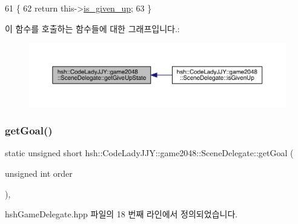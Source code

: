 \begin{DoxyCode}
61                                      \{
62                     \textcolor{keywordflow}{return} this->\hyperlink{classhsh_1_1_code_lady_j_j_y_1_1game2048_1_1_scene_delegate_a8ea6710e5c00d1af16c4566260c62501}{is\_given\_up};
63                 \}
\end{DoxyCode}
이 함수를 호출하는 함수들에 대한 그래프입니다.\+:
\nopagebreak
\begin{figure}[H]
\begin{center}
\leavevmode
\includegraphics[width=350pt]{d7/d4d/classhsh_1_1_code_lady_j_j_y_1_1game2048_1_1_scene_delegate_abe91b73b30ea51884c07d50f4a9664f3_icgraph}
\end{center}
\end{figure}
\mbox{\label{classhsh_1_1_code_lady_j_j_y_1_1game2048_1_1_scene_delegate_a4b1f64a13b6816a657bc21bdc6a17c61}} 
\subsubsection{\texorpdfstring{get\+Goal()}{getGoal()}\hspace{0.1cm}{\footnotesize\ttfamily [1/2]}}
{\footnotesize\ttfamily static unsigned short hsh\+::\+Code\+Lady\+J\+J\+Y\+::game2048\+::\+Scene\+Delegate\+::get\+Goal (\begin{DoxyParamCaption}\item[{unsigned int}]{order }\end{DoxyParamCaption})\hspace{0.3cm}{\ttfamily [inline]}, {\ttfamily [static]}}



hsh\+Game\+Delegate.\+hpp 파일의 18 번째 라인에서 정의되었습니다.



